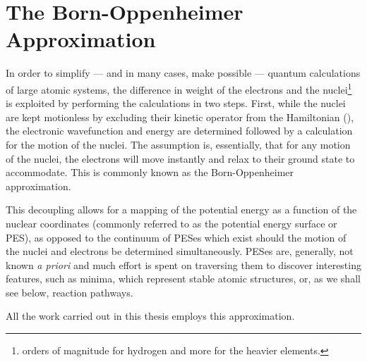 \section{The Born-Oppenheimer Approximation}
\label{sec:born-oppenheimer}

In order to simplify --- and in many cases, make possible --- quantum calculations of large atomic systems, the difference in weight of the electrons and the nuclei\footnote{ orders of magnitude for hydrogen and more for the heavier elements.} is exploited by performing the calculations in two steps.
First, while the nuclei are kept motionless by excluding their kinetic operator from the Hamiltonian (), the electronic wavefunction and energy are determined followed by a calculation for the motion of the nuclei.
The assumption is, essentially, that for any motion of the nuclei, the electrons will move instantly and relax to their ground state to accommodate.
This is commonly known as the Born-Oppenheimer approximation.\cite{born-oppenheimer-1927}


This decoupling allows for a mapping of the potential energy as a function of the nuclear coordinates (commonly referred to as the potential energy surface or PES), as opposed to the continuum of PESes which exist should the motion of the nuclei and electrons be determined simultaneously.
PESes are, generally, not known \textit{a priori} and much effort is spent on traversing them to discover interesting features, such as minima, which represent stable atomic structures, or, as we shall see below, reaction pathways.




All the work carried out in this thesis employs this approximation.
